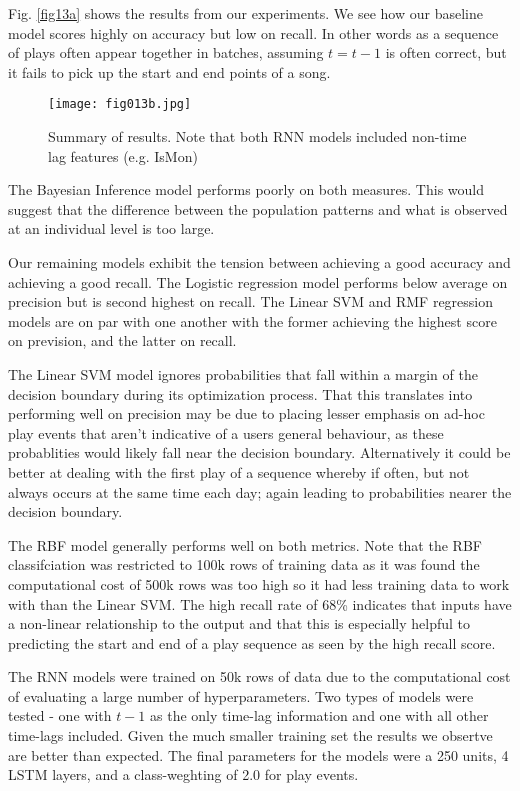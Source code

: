 Fig. \ref{fig13a} shows the results from our experiments. We see how our baseline model scores highly on accuracy but low on recall. In other words as a sequence of plays often appear together in batches, assuming $t = t-1$ is often correct, but it fails to pick up the start and end points of a song.

\begin{figure}[h!]
	\centering
	\texttt{[image: fig013b.jpg]}
	\caption{Summary of results. Note that both RNN models included non-time lag features (e.g. IsMon)}
	\label{fig13b}
\end{figure}  


The Bayesian Inference model performs poorly on both measures. This would suggest that the difference between the population patterns and what is observed at an individual level is too large.

Our remaining models exhibit the tension between achieving a good accuracy and achieving a good recall.
The Logistic regression model performs below average on precision but is second highest on recall. The Linear SVM and RMF regression models are on par with one another with the former achieving the highest score on prevision, and the latter on recall. 

The Linear SVM model ignores probabilities that fall within a margin of the decision boundary during its optimization process. That this translates into performing well on precision may be due to placing lesser emphasis on ad-hoc play events that aren't indicative of a users general behaviour, as these probablities would likely fall near the decision boundary. Alternatively it could be better at dealing with the first play of a sequence whereby if often, but not always occurs at the same time each day; again leading to probabilities nearer the decision boundary.

The RBF model generally performs well on both metrics. Note that the RBF classifciation was restricted to 100k rows of training data as it was found the computational cost of 500k rows was too high so it had less training data to work with than the Linear SVM. The high recall rate of 68\% indicates that inputs have a non-linear relationship to the output and that this is especially helpful to predicting the start and end of a play sequence as seen by the high recall score. 
 
The RNN models were trained on 50k rows of data due to the computational cost of evaluating a large number of hyperparameters. Two types of models were tested - one with $t-1$ as the only time-lag information and one with all other time-lags included. Given the much smaller training set the results we obsertve are better than expected.  The final parameters for the models were a 250 units, 4 LSTM layers, and a class-weghting of 2.0 for play events.


